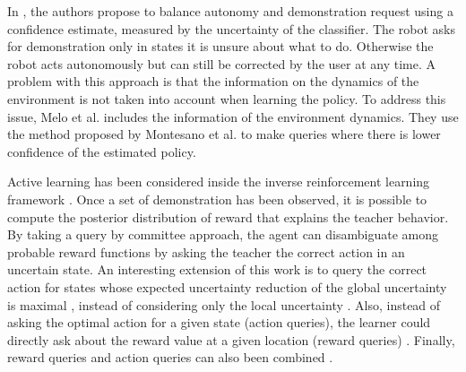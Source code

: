 In \cite{chernova09jair}, the authors propose to balance autonomy and demonstration request using a confidence estimate, measured by the uncertainty of the classifier. The robot asks for demonstration only in states it is unsure about what to do. Otherwise the robot acts autonomously but can still be corrected by the user at any time. A problem with this approach is that the information on the dynamics of the environment is not taken into account when learning the policy. To address this issue, Melo et al. \cite{melo2010learning} includes the information of the environment dynamics. They use the method proposed by Montesano et al. \cite{montesano2012active} to make queries where there is lower confidence of the estimated policy.



Active learning has been considered inside the inverse reinforcement learning framework \cite{macl09airl}. Once a set of demonstration has been observed, it is possible to compute the posterior distribution of reward that explains the teacher behavior. By taking a query by committee approach, the agent can disambiguate among probable reward functions by asking the teacher the correct action in an uncertain state. An interesting extension of this work is to query the correct action for states whose expected uncertainty reduction of the global uncertainty is maximal \cite{cohn2010selecting,cohn2011comparing}, instead of considering only the local uncertainty \cite{macl09airl}. Also,  instead of asking the optimal action for a given state (action queries), the learner could directly ask about the reward value at a given location (reward queries) \cite{regan2011eliciting}. Finally, reward queries and action queries can also been combined \cite{melo2013multi}.





